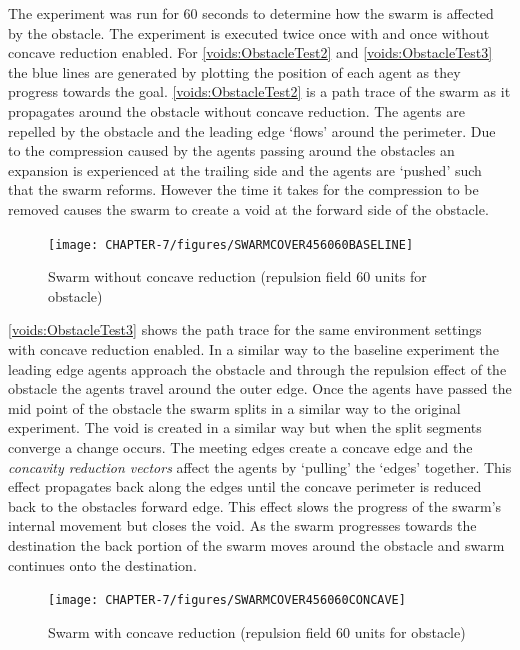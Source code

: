 The experiment was run for 60 seconds to determine how the swarm is affected by the obstacle. The experiment is executed twice once with and once without concave reduction enabled. For \autoref{voids:ObstacleTest2} and \autoref{voids:ObstacleTest3} the blue lines are generated by plotting the position of each agent as they progress towards the goal. \autoref{voids:ObstacleTest2} is a path trace of the swarm as it propagates around the obstacle without concave reduction. The agents are repelled by the obstacle and the leading edge `flows' around the perimeter. Due to the compression caused by the agents passing around the obstacles an expansion is experienced at the trailing side and the agents are `pushed' such that the swarm reforms. However the time it takes for the compression to be removed causes the swarm to create a void at the forward side of the obstacle.  

\begin{figure}[H]
\begin{center}
\texttt{[image: CHAPTER-7/figures/SWARMCOVER456060BASELINE]}
\end{center}
\caption{Swarm without concave reduction (repulsion field 60 units for obstacle)\label{voids:ObstacleTest2}}
\end{figure}

\autoref{voids:ObstacleTest3} shows the path trace for the same environment settings with concave reduction enabled. In a similar way to the baseline experiment the leading edge agents approach the obstacle and through the repulsion effect of the obstacle the agents travel around the outer edge. Once the agents have passed the mid point of the obstacle the swarm splits in a similar way to the original experiment. The void is created in a similar way but when the split segments converge a change occurs. The meeting edges create a concave edge and the \textit{concavity reduction vectors} affect the agents by `pulling' the `edges' together. This effect propagates back along the edges until the concave perimeter is reduced back to the obstacles forward edge. This effect slows the progress of the swarm's internal movement but closes the void. As the swarm progresses towards the destination the back portion of the swarm moves around the obstacle and swarm continues onto the destination.

\begin{figure}[H]
\begin{center}
\texttt{[image: CHAPTER-7/figures/SWARMCOVER456060CONCAVE]}
\end{center}
\caption{Swarm with concave reduction (repulsion field 60 units for obstacle)\label{voids:ObstacleTest3}}
\end{figure}

